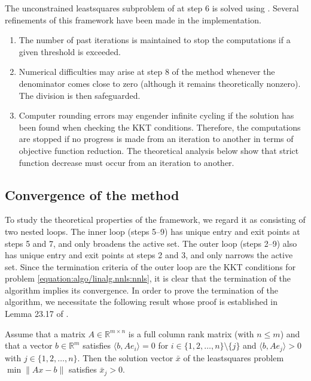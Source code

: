 \documentclass[letterpaper,10pt,english]{sphinxmanual}
\newcommand{\norm}[2][]{#1\lVert#2#1\rVert}
\newcommand{\set}[2][]{#1\{#2#1\}}
\newcommand{\inner}[2][]{#1\langle#2#1\rangle}
\def\R{\ensuremath{\mathds{R}}}
\begin{document}
\sphinxAtStartPar
The unconstrained least\sphinxhyphen{}squares subproblem of  at step 6 is solved using
. Several refinements of this framework have been made in
the implementation.
\begin{enumerate}
%
\item {} 
\sphinxAtStartPar
The number of past iterations is maintained to stop the computations if a
given threshold is exceeded.

\item {} 
\sphinxAtStartPar
Numerical difficulties may arise at step 8 of the method whenever the
denominator comes close to zero (although it remains theoretically nonzero).
The division is then safeguarded.

\item {} 
\sphinxAtStartPar
Computer rounding errors may engender infinite cycling if the solution has
been found when checking the KKT conditions. Therefore, the computations are
stopped if no progress is made from an iteration to another in terms of
objective function reduction. The theoretical analysis below show that
strict function decrease must occur from an iteration to another.

\end{enumerate}


\subsection{Convergence of the method}
\label{\detokenize{algo/linalg.nnls:convergence-of-the-method}}
\sphinxAtStartPar
To study the theoretical properties of the framework, we regard it as
consisting of two nested loops. The inner loop (steps 5–9) has unique entry
and exit points at steps 5 and 7, and only broadens the active set. The outer
loop (steps 2–9) also has unique entry and exit points at steps 2 and 3, and
only narrows the active set. Since the termination criteria of the outer loop
are the KKT conditions for problem \eqref{equation:algo/linalg.nnls:nnls}, it is clear that the termination
of the algorithm implies its convergence. In order to prove the termination of
the algorithm, we necessitate the following result whose proof is established
in Lemma 23.17 of .

\sphinxAtStartPar
{} Assume that a matrix \(A \in \R^{m \times n}\) is a full
column rank matrix (with \(n \le m\)) and that a vector \(b \in \R^m\)
satisfies \(\inner{b, Ae_i} = 0\) for
\(i \in \set{1, 2, \dots, n} \setminus \set{j}\) and
\(\inner{b, Ae_j} > 0\) with \(j \in \set{1, 2, \dots, n}\). Then
the solution vector \(\bar{x}\) of the least\sphinxhyphen{}squares problem
\(\min \norm{Ax - b}\) satisfies \(\bar{x}_j > 0\).
\end{document}
